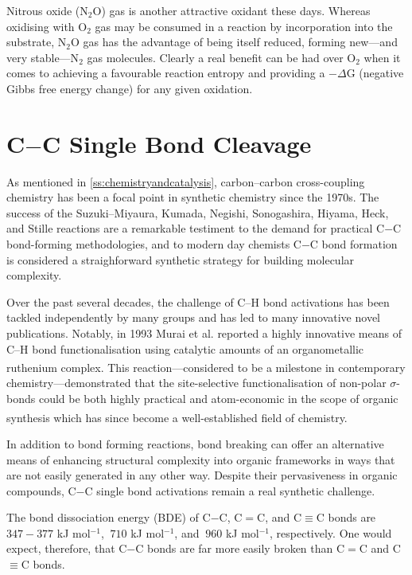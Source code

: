 Nitrous oxide (N$_2$O) gas is another attractive oxidant these days. Whereas oxidising with O$_2$ gas may be consumed in a reaction by incorporation into the substrate, N$_2$O gas has the advantage of being itself reduced, forming new---and very stable---N$_2$ gas molecules. Clearly a real benefit can be had over O$_2$ when it comes to achieving a favourable reaction entropy and providing a $-\Delta$G (negative Gibbs free energy change) for any given oxidation.

\section{C$-$C Single Bond Cleavage}

\noindent As mentioned in \autoref{ss:chemistryandcatalysis}, carbon--carbon cross-coupling chemistry has been a focal point in synthetic chemistry since the 1970s. The success of the Suzuki--Miyaura, Kumada, Negishi, Sonogashira, Hiyama, Heck, and Stille reactions are a remarkable testiment to the demand for practical C$-$C bond-forming methodologies, and to modern day chemists C$-$C bond formation is considered a straighforward synthetic strategy for building molecular complexity.

Over the past several decades, the challenge of C--H bond activations has been tackled independently by many groups and has led to many innovative novel publications. Notably, in 1993 Murai et al. reported a highly innovative means of C--H bond functionalisation using catalytic amounts of an organometallic ruthenium complex.\textsuperscript{\cite{murai:1993}} This reaction---considered to be a milestone in contemporary chemistry---demonstrated that the site-selective functionalisation of non-polar $\sigma$-bonds could be both highly practical and atom-economic in the scope of organic synthesis which has since become a well-established field of chemistry.\textsuperscript{\cite{crabtree:2017, labinger:2017, roque:2018}}

In addition to bond forming reactions, bond breaking can offer an alternative means of enhancing structural complexity into organic frameworks in ways that are not easily generated in any other way. Despite their pervasiveness in organic compounds, C$-$C single bond activations remain a real synthetic challenge.

The bond dissociation energy (BDE) of C$-$C, C$=$C, and C$\equiv$C bonds are $347-377$ kJ mol$^{-1}$, $~710$ kJ mol$^{-1}$, and $~960$ kJ mol$^{-1}$, respectively. One would expect, therefore, that C$-$C bonds are far more easily broken than C$=$C and C$\equiv$C bonds.

